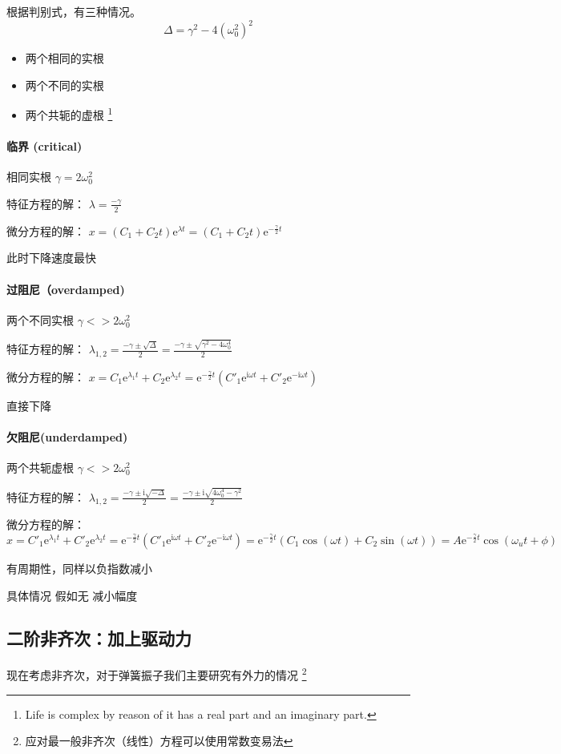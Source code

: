 \documentclass[11pt]{book}
\begin{document}
根据判别式，有三种情况。
$$\Delta = \gamma^2-4(\omega_0^2)^2$$
\begin{itemize}
\item 两个相同的实根
\item 两个不同的实根
\item 两个共轭的虚根
\footnote{Life is complex by reason of it has a real part and an imaginary part.}
\end{itemize}

\paragraph{临界 (critical)} 相同实根 \(\gamma = 2\omega_0^2\)

特征方程的解： \(\lambda=\frac{-\gamma}{2}\)

微分方程的解： \(x=(C_1+C_2t)\mathrm{e}^{\lambda t}=(C_1+C_2t)\mathrm{e}^{-\frac{\gamma}{2}t}\)

此时下降速度最快
\paragraph{过阻尼（overdamped)} 两个不同实根 \(\gamma <> 2\omega_0^2\)

特征方程的解： \(\lambda_{1,2}=\frac{-\gamma\pm\sqrt{\Delta}}{2}=\frac{-\gamma\pm\sqrt{\gamma^2 - 4\omega_0^4}}{2}\)

微分方程的解： \(x=C_1\mathrm{e}^{\lambda_1 t}+C_2\mathrm{e}^{\lambda_2 t}=\mathrm{e}^{-\frac{\gamma}{2}t}(C'_1\mathrm{e}^{\mathrm{i}\omega t}+C'_2\mathrm{e}^{-\mathrm{i}\omega t})\)

直接下降
\paragraph{欠阻尼(underdamped)} 两个共轭虚根 \(\gamma <> 2\omega_0^2\)

特征方程的解： \(\lambda_{1,2}=\frac{-\gamma\pm \mathrm{i}\sqrt{-\Delta}}{2}=\frac{-\gamma\pm \mathrm{i}\sqrt{4\omega_0^4-\gamma^2}}{2}\)

微分方程的解： \(x=C'_1\mathrm{e}^{\lambda_1 t}+C'_2\mathrm{e}^{\lambda_2 t}=\mathrm{e}^{-\frac{\gamma}{2}t}(C'_1\mathrm{e}^{\mathrm{i}\omega t}+C'_2\mathrm{e}^{-\mathrm{i}\omega t})=\mathrm{e}^{-\frac{\gamma}{2}t}(C_1\cos(\omega t)+C_2\sin(\omega t))=A\mathrm{e}^{-\frac{\gamma}{2}t}\cos(\omega_u t+\phi)\)

有周期性，同样以负指数减小

具体情况
假如无
减小幅度
\subsection{二阶非齐次：加上驱动力}
\label{sec:org72023e4}
现在考虑非齐次，对于弹簧振子我们主要研究有外力的情况
\footnote{应对最一般非齐次（线性）方程可以使用常数变易法}
\end{document}
